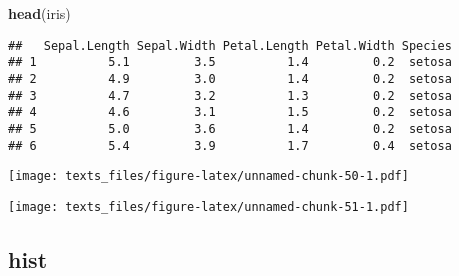 \documentclass[]{book}
\newenvironment{Shaded}{\begin{snugshade}}{\end{snugshade}}
\newcommand{\DataTypeTok}[1]{\textcolor[rgb]{0.13,0.29,0.53}{#1}}
\newcommand{\DecValTok}[1]{\textcolor[rgb]{0.00,0.00,0.81}{#1}}
\newcommand{\KeywordTok}[1]{\textcolor[rgb]{0.13,0.29,0.53}{\textbf{#1}}}
\newcommand{\NormalTok}[1]{#1}
\newcommand{\OperatorTok}[1]{\textcolor[rgb]{0.81,0.36,0.00}{\textbf{#1}}}
\newcommand{\StringTok}[1]{\textcolor[rgb]{0.31,0.60,0.02}{#1}}
\begin{document}
\begin{Shaded}
\begin{Highlighting}[]
\KeywordTok{head}\NormalTok{(iris)}
\end{Highlighting}
\end{Shaded}

\begin{verbatim}
##   Sepal.Length Sepal.Width Petal.Length Petal.Width Species
## 1          5.1         3.5          1.4         0.2  setosa
## 2          4.9         3.0          1.4         0.2  setosa
## 3          4.7         3.2          1.3         0.2  setosa
## 4          4.6         3.1          1.5         0.2  setosa
## 5          5.0         3.6          1.4         0.2  setosa
## 6          5.4         3.9          1.7         0.4  setosa
\end{verbatim}

\begin{Shaded}
\end{Shaded}

\texttt{[image: texts\_files/figure-latex/unnamed-chunk-50-1.pdf]}

\begin{Shaded}
\end{Shaded}

\texttt{[image: texts\_files/figure-latex/unnamed-chunk-51-1.pdf]}

\hypertarget{hist}{%
\subsection*{\texorpdfstring{\textbf{hist}}{hist}}\label{hist}}
\end{document}
